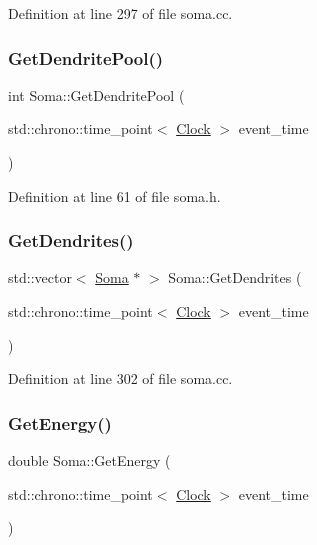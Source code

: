 Definition at line 297 of file soma.\+cc.

\mbox{\label{class_soma_a000d9eca00c61af853fd81a2c1569b0e}} 
\subsubsection{\texorpdfstring{Get\+Dendrite\+Pool()}{GetDendritePool()}}
{\footnotesize\ttfamily int Soma\+::\+Get\+Dendrite\+Pool (\begin{DoxyParamCaption}\item[{std\+::chrono\+::time\+\_\+point$<$ \mbox{\hyperlink{universe_8h_a0ef8d951d1ca5ab3cfaf7ab4c7a6fd80}{Clock}} $>$}]{event\+\_\+time }\end{DoxyParamCaption})\hspace{0.3cm}{\ttfamily [inline]}}



Definition at line 61 of file soma.\+h.

\mbox{\label{class_soma_afdb0e40855f31f2d9a48f3b13c01b599}} 
\subsubsection{\texorpdfstring{Get\+Dendrites()}{GetDendrites()}}
{\footnotesize\ttfamily std\+::vector$<$ \mbox{\hyperlink{class_soma}{Soma}} $\ast$ $>$ Soma\+::\+Get\+Dendrites (\begin{DoxyParamCaption}\item[{std\+::chrono\+::time\+\_\+point$<$ \mbox{\hyperlink{universe_8h_a0ef8d951d1ca5ab3cfaf7ab4c7a6fd80}{Clock}} $>$}]{event\+\_\+time }\end{DoxyParamCaption})}



Definition at line 302 of file soma.\+cc.

\mbox{\label{class_soma_a91dca73d2f5f97247cae0217a8c1440a}} 
\subsubsection{\texorpdfstring{Get\+Energy()}{GetEnergy()}}
{\footnotesize\ttfamily double Soma\+::\+Get\+Energy (\begin{DoxyParamCaption}\item[{std\+::chrono\+::time\+\_\+point$<$ \mbox{\hyperlink{universe_8h_a0ef8d951d1ca5ab3cfaf7ab4c7a6fd80}{Clock}} $>$}]{event\+\_\+time }\end{DoxyParamCaption})\hspace{0.3cm}{\ttfamily [inline]}}



